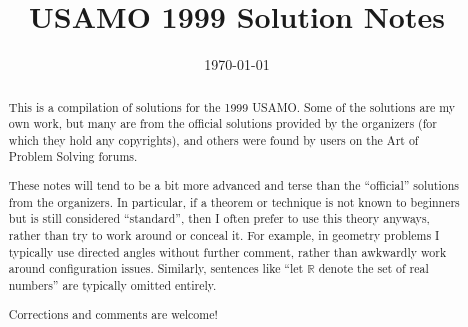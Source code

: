 \documentclass[11pt]{scrartcl}
\title{USAMO 1999 Solution Notes}
\date{\today}
\begin{document}
\maketitle

\begin{abstract}
This is a compilation of solutions
for the 1999 USAMO.
Some of the solutions are my own work,
but many are from the official solutions provided by the organizers
(for which they hold any copyrights),
and others were found by users on the Art of Problem Solving forums.

These notes will tend to be a bit more advanced and terse than the ``official''
solutions from the organizers.
In particular, if a theorem or technique is not known to beginners
but is still considered ``standard'', then I often prefer to
use this theory anyways, rather than try to work around or conceal it.
For example, in geometry problems I typically use directed angles
without further comment, rather than awkwardly work around configuration issues.
Similarly, sentences like ``let $\mathbb{R}$ denote the set of real numbers''
are typically omitted entirely.

Corrections and comments are welcome!
\end{abstract}

\tableofcontents
\newpage

\addtocounter{section}{-1}
\end{document}
